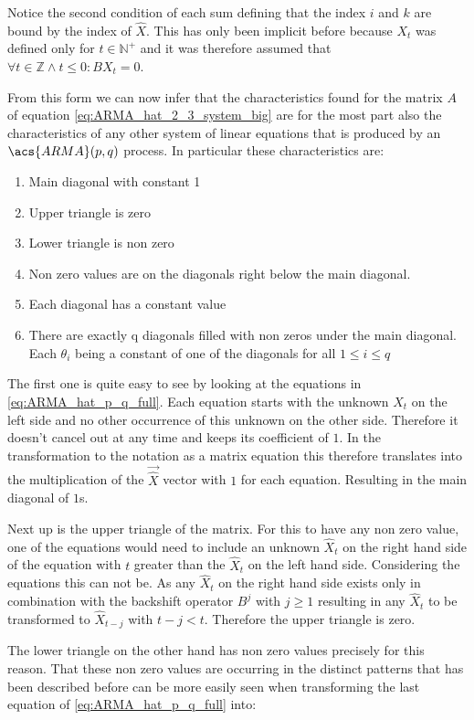 Notice the second condition of each sum defining that the index $i$ and $k$ are bound by the index of $\hat{X}$. This has only been implicit before because $X_t$ was defined only for $t \in \mathbb{N}^+$ and it was therefore assumed that $\forall t \in \mathbb{Z} \wedge t \leq 0 : B X_t = 0$.

From this form we can now infer that the characteristics found for the matrix $A$ of equation \ref{eq:ARMA_hat_2_3_system_big} are for the most part also the characteristics of any other system of linear equations that is produced by an $\acs{ARMA}(p,q)$ process. In particular these characteristics are:
\begin{enumerate}
    \item Main diagonal with constant 1
    \item Upper triangle is zero
    \item Lower triangle is non zero
    \item Non zero values are on the diagonals right below the main diagonal.
    \item Each diagonal has a constant value
    \item There are exactly q diagonals filled with non zeros under the main diagonal. Each $\theta_i$ being a constant of one of the diagonals for all $1 \leq i \leq q$
\end{enumerate}

The first one is quite easy to see by looking at the equations in \ref{eq:ARMA_hat_p_q_full}. Each equation starts with the unknown $\hat{X}_t$ on the left side and no other occurrence of this unknown on the other side. Therefore it doesn't cancel out at any time and keeps its coefficient of $1$. In the transformation to the notation as a matrix equation this therefore translates into the multiplication of the $\vec{\hat{X}}$ vector with $1$ for each equation. Resulting in the main diagonal of $1$s.

Next up is the upper triangle of the matrix. For this to have any non zero value, one of the equations would need to include an unknown $\hat{X}_t$ on the right hand side of the equation with $t$ greater than the $\hat{X}_t$ on the left hand side. Considering the equations this can not be. As any $\hat{X}_t$ on the right hand side exists only in combination with the backshift operator $B^j$ with $j \geq 1$ resulting in any $\hat{X}_t$ to be transformed to $\hat{X}_{t-j}$ with $t-j < t$. Therefore the upper triangle is zero.

The lower triangle on the other hand has non zero values precisely for this reason. That these non zero values are occurring in the distinct patterns that has been described before can be more easily seen when transforming the last equation of \ref{eq:ARMA_hat_p_q_full} into:

